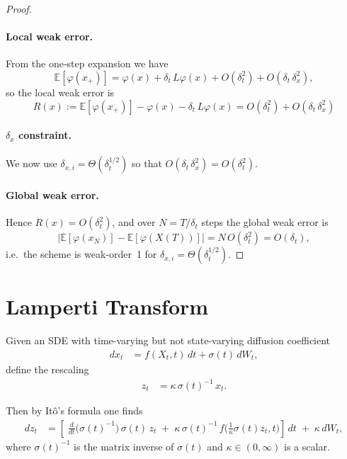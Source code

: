 \documentclass[pra,showpacs,amsmath,amssymb,amsfonts,lengthcheck,longbibliography,onecolumn]{revtex4-2}
\newcommand{\E}{\mathbb{E}}
\begin{document}
\begin{proof}
\paragraph{Local weak error.}
From the one‐step expansion we have
\[
  \E[\varphi(x_{+})]
  = \varphi(x)
  + \delta_t\,L\varphi(x)
  + O(\delta_t^2)
  + O(\delta_t\,\delta_x^2),
\]
so the local weak error is
\[
  R(x)
  := \E[\varphi(x_{+})] - \varphi(x) - \delta_t\,L\varphi(x)
  = O(\delta_t^2)
  + O(\delta_t\,\delta_x^2)
\]

\paragraph{$\delta_x$ constraint.} We now use $\delta_{x,i} = \Theta(\delta_t^{1/2})$ so that \(O(\delta_t\,\delta_x^2)=O(\delta_t^2)\).


\paragraph{Global weak error.}
Hence $R(x) = O(\delta_t^2)$,
and over \(N=T/\delta_t\) steps the global weak error is
\[
  \bigl|\E[\varphi(x_N)] - \E[\varphi(X(T))]\bigr|
  = N\,O(\delta_t^2)
  = O(\delta_t),
\]
i.e.\ the scheme is weak‐order~1 for $\delta_{x,i} = \Theta(\delta_t^{1/2})$.

\end{proof}


\section{Lamperti Transform}\label{sec:lamperti}
Given an SDE with time-varying but not state-varying diffusion coefficient
\begin{align*}
dx_t &= f(X_t,t)\,dt + \sigma(t)\,dW_t, 
\end{align*}
define the rescaling
\begin{align*}
z_t &= \kappa\,\sigma(t)^{-1}\,x_t.
\end{align*}

Then by Itô’s formula one finds
\begin{align}\label{eq:lamperti}
dz_t
&=\left[
\;\frac{d}{dt}\bigl(\sigma(t)^{-1}\bigr)\,\sigma(t)\,z_t
\;+\;
\kappa\,\sigma(t)^{-1}\,f\!\bigl(\tfrac{1}{\kappa} \sigma(t) z_t,t\bigr)
\right]\,dt
\;+\;\kappa\,dW_t,
\end{align}
where $\sigma(t)^{-1}$ is the matrix inverse of $\sigma(t)$ and $\kappa \in (0, \infty)$ is a scalar.
\end{document}
